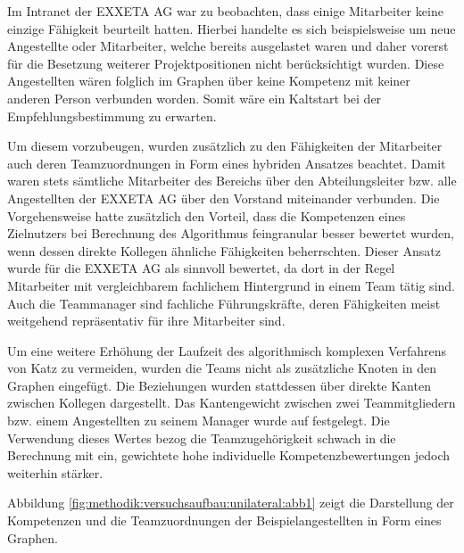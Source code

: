 Im Intranet der EXXETA AG war zu beobachten, dass einige Mitarbeiter keine einzige Fähigkeit beurteilt hatten. Hierbei handelte es sich beispielsweise um neue Angestellte oder Mitarbeiter, welche bereits ausgelastet waren und daher vorerst für die Besetzung weiterer Projektpositionen nicht berücksichtigt wurden. Diese Angestellten wären folglich im Graphen über keine Kompetenz mit keiner anderen Person verbunden worden. Somit wäre ein Kaltstart bei der Empfehlungsbestimmung zu erwarten.

Um diesem vorzubeugen, wurden zusätzlich zu den Fähigkeiten der Mitarbeiter auch deren Teamzuordnungen in Form eines hybriden Ansatzes beachtet. Damit waren stets sämtliche Mitarbeiter des Bereichs \JES über den Abteilungsleiter bzw. alle Angestellten der EXXETA AG über den Vorstand miteinander verbunden. Die Vorgehensweise hatte zusätzlich den Vorteil, dass die Kompetenzen eines Zielnutzers bei Berechnung des Algorithmus feingranular besser bewertet wurden, wenn dessen direkte Kollegen ähnliche Fähigkeiten beherrschten. Dieser Ansatz wurde für die EXXETA AG als sinnvoll bewertet, da dort in der Regel Mitarbeiter mit vergleichbarem fachlichem Hintergrund in einem Team tätig sind. Auch die Teammanager sind fachliche Führungskräfte, deren Fähigkeiten meist weitgehend repräsentativ für ihre Mitarbeiter sind.

Um eine weitere Erhöhung der Laufzeit des algorithmisch komplexen Verfahrens von Katz zu vermeiden, wurden die Teams nicht als zusätzliche Knoten in den Graphen eingefügt. Die Beziehungen wurden stattdessen über direkte Kanten zwischen Kollegen dargestellt. Das Kantengewicht zwischen zwei Teammitgliedern bzw. einem Angestellten zu seinem Manager wurde auf \teamgewichtString festgelegt. Die Verwendung dieses Wertes bezog die Teamzugehörigkeit schwach in die Berechnung mit ein, gewichtete hohe individuelle Kompetenzbewertungen jedoch weiterhin stärker.

Abbildung \ref{fig:methodik:versuchsaufbau:unilateral:abb1} zeigt die Darstellung der Kompetenzen und die Teamzuordnungen der Beispielangestellten in Form eines Graphen.

